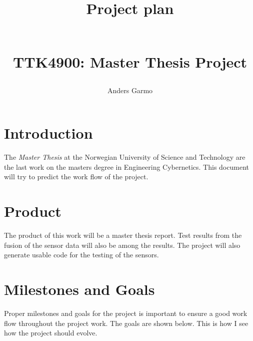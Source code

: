 \documentclass[a4paper, 10pt]{article}
\title{\begin{huge}\textbf{Project plan}\end{huge} \\ TTK4900: Master Thesis Project }
\author{Anders Garmo}
\begin{document}
\maketitle

\newpage


\section{Introduction}
The \emph{Master Thesis} at the Norwegian University of Science and Technology are the
last work on the masters degree in Engineering Cybernetics. This document will try to
predict the work flow of the project. 

\section{Product}
The product of this work will be a master thesis report. Test results from the fusion of
the sensor data will also be among the results. The project will also generate usable code
for the testing of the sensors. 

\section{Milestones and Goals}
Proper milestones and goals for the project is important to ensure a good work flow throughout the
project work. The goals are shown below. This is how I see how the project should evolve. 
\end{document}
